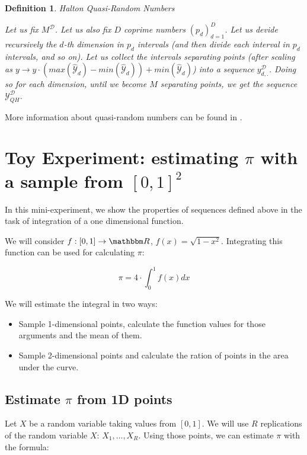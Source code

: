 \documentclass[shortabstract]{iithesis}
\newtheorem{definition}{Definition}
\begin{document}
\begin{definition} {Halton Quasi-Random Numbers}

    Let us fix $M^{\mathcal  D}$. Let us also fix $D$ coprime numbers $(p_d)_{d=1}^D$. Let us devide recursively the $d$-th dimension in $p_d$ intervals (and then divide each interval in $p_d$ intervals, and so on). Let us collect the intervals separating points (after scaling as $y \rightarrow y \cdot  (max (\hat{\mathcal{Y}}_d)  - min(\hat{\mathcal{Y}}_d))  + min(\hat{\mathcal{Y}}_d)$) into a sequence  $y^{\mathcal D}_{d, .}$.  Doing so for each dimension, until we become $M$ separating points,  we get the sequence $\mathcal Y ^{\mathcal D}_{QH}$.
    
\end{definition}

More information about quasi-random numbers can be found in \cite{quasi_random}. 

\section{Toy Experiment: estimating $\pi$ with a sample from $[0, 1]^2$}

In this mini-experiment,  we show the properties of sequences defined above in the task of integration of a  one dimensional function.  

We will consider $f: [0, 1] \rightarrow \mathbbm R$, $f(x) =  \sqrt{1 - x^2}$. Integrating this function can be used for calculating $\pi$:

\begin{equation} \label{eq:toy_pi}
    \pi = 4 \cdot \int_0^1 f(x) dx
\end{equation}

We will estimate the integral in two ways:

\begin{itemize}
    \item Sample 1-dimensional points, calculate the function values for those arguments and the mean of them. 
    \item Sample 2-dimensional points and calculate the ration of points in the area under the curve.  
\end{itemize}


\subsection{Estimate $\pi$ from 1D points}

Let $X$ be a random variable taking values from $[0,  1]$. We will use $R$ replications of the random variable $X$: $X_1,  \ldots, X_R$. Using those points, we can estimate $\pi$ with the formula:
\end{document}
